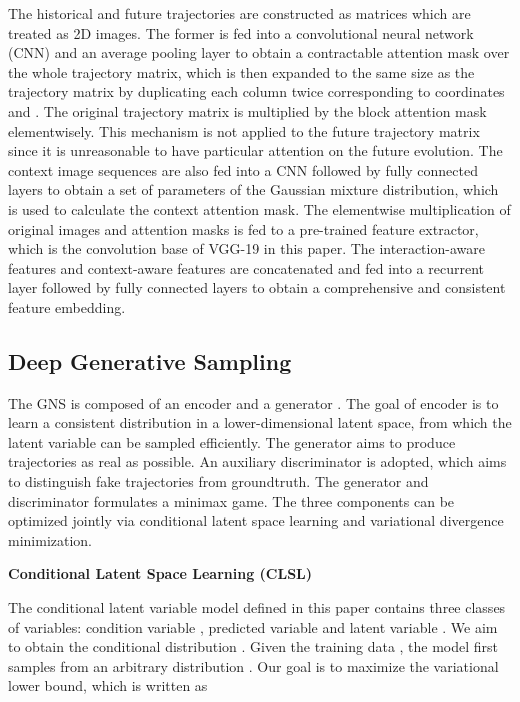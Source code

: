 \documentclass[letterpaper, 10 pt, conference]{ieeeconf}
\begin{document}
The historical and future trajectories are constructed as matrices which are treated as 2D images. The former is fed into a convolutional neural network (CNN) and an average pooling layer to obtain a contractable attention mask over the whole trajectory matrix, which is then expanded to the same size as the trajectory matrix by duplicating each column twice corresponding to coordinates  and . 
The original trajectory matrix is multiplied by the block attention mask elementwisely. This mechanism is not applied to the future trajectory matrix since it is unreasonable to have particular attention on the future evolution.
The context image sequences are also fed into a CNN followed by fully connected layers to obtain a set of parameters of the Gaussian mixture distribution, which is used to calculate the context attention mask. The elementwise multiplication of original images and attention masks is fed to a pre-trained feature extractor, which is the convolution base of VGG-19 \cite{vgg19} in this paper. The interaction-aware features and context-aware features are concatenated and fed into a recurrent layer followed by fully connected layers to obtain a comprehensive and consistent feature embedding.

\subsection{Deep Generative Sampling}
The GNS is composed of an encoder  and a generator . The goal of encoder is to learn a consistent distribution in a lower-dimensional latent space, from which the latent variable can be sampled efficiently. The generator aims to produce trajectories as real as possible. An auxiliary discriminator  is adopted, which aims to distinguish fake trajectories from groundtruth.
The generator  and discriminator  formulates a minimax game. The three components can be optimized jointly via conditional latent space learning and variational divergence minimization.
\vspace{0.1cm}

\noindent
\textbf{Conditional Latent Space Learning (CLSL)}

The conditional latent variable model defined in this paper contains three classes of variables: condition variable , predicted variable  and latent variable . We aim to obtain the conditional distribution .
Given the training data , the model first samples  from an arbitrary distribution . 
Our goal is to maximize the variational lower bound, which is written as
\end{document}
